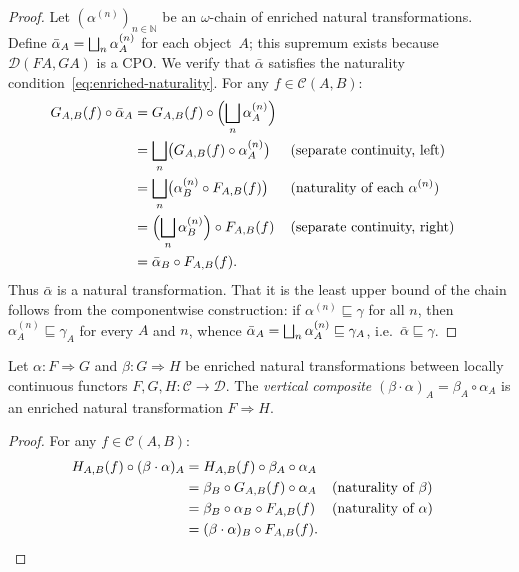 \begin{proof}
Let $(\alpha^{(n)})_{n \in \mathbb{N}}$ be an $\omega$-chain of enriched
natural transformations. Define
$\bar{\alpha}_A = \bigsqcup_n \alpha^{(n)}_A$ for each object~$A$; this
supremum exists because $\mathcal{D}(FA, GA)$ is a CPO. We verify that
$\bar{\alpha}$ satisfies the naturality
condition~\eqref{eq:enriched-naturality}. For any
$f \in \mathcal{C}(A, B)$:
\begin{align*}
  G_{A,B}(f) \circ \bar{\alpha}_A
    &= G_{A,B}(f) \circ \Bigl(\bigsqcup_n \alpha^{(n)}_A\Bigr) \\
    &= \bigsqcup_n \bigl(G_{A,B}(f) \circ \alpha^{(n)}_A\bigr)
       && \text{(separate continuity, left)} \\
    &= \bigsqcup_n \bigl(\alpha^{(n)}_B \circ F_{A,B}(f)\bigr)
       && \text{(naturality of each $\alpha^{(n)}$)} \\
    &= \Bigl(\bigsqcup_n \alpha^{(n)}_B\Bigr) \circ F_{A,B}(f)
       && \text{(separate continuity, right)} \\
    &= \bar{\alpha}_B \circ F_{A,B}(f).
\end{align*}
Thus $\bar{\alpha}$ is a natural transformation. That it is the least
upper bound of the chain follows from the componentwise construction:
if $\alpha^{(n)} \sqsubseteq \gamma$ for all $n$, then
$\alpha^{(n)}_A \sqsubseteq \gamma_A$ for every $A$ and $n$, whence
$\bar{\alpha}_A = \bigsqcup_n \alpha^{(n)}_A \sqsubseteq \gamma_A$,
i.e.\ $\bar{\alpha} \sqsubseteq \gamma$.
\end{proof}

\begin{proposition}
\label{prop:vcomp}
Let $\alpha : F \Rightarrow G$ and $\beta : G \Rightarrow H$ be enriched
natural transformations between locally continuous functors
$F, G, H : \mathcal{C} \to \mathcal{D}$. The \emph{vertical composite}
$(\beta \cdot \alpha)_A = \beta_A \circ \alpha_A$ is an enriched natural
transformation $F \Rightarrow H$.
\end{proposition}

\begin{proof}
For any $f \in \mathcal{C}(A, B)$:
\begin{align*}
  H_{A,B}(f) \circ (\beta \cdot \alpha)_A
    &= H_{A,B}(f) \circ \beta_A \circ \alpha_A \\
    &= \beta_B \circ G_{A,B}(f) \circ \alpha_A
       && \text{(naturality of $\beta$)} \\
    &= \beta_B \circ \alpha_B \circ F_{A,B}(f)
       && \text{(naturality of $\alpha$)} \\
    &= (\beta \cdot \alpha)_B \circ F_{A,B}(f). \qedhere
\end{align*}
\end{proof}

